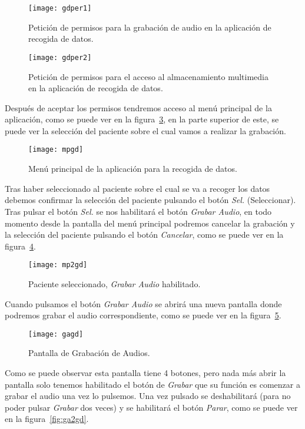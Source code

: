 \begin{figure}[htb]
	\centering
	\texttt{[image: gdper1]}
	\caption{Petición de permisos para la grabación de audio en la aplicación de recogida de datos.}
	\label{fig:gdper1}
\end{figure}

\begin{figure}[H]
	\centering
	\texttt{[image: gdper2]}
	\caption{Petición de permisos para el acceso al almacenamiento multimedia en la aplicación de recogida de datos.}
	\label{fig:gdper2}
\end{figure}

Después de aceptar los permisos tendremos acceso al menú principal de la aplicación, como se puede ver en la figura~\ref{fig:mpgd}, en la parte superior de este, se puede ver la selección del paciente sobre el cual vamos a realizar la grabación.

\begin{figure}[h]
	\centering
	\texttt{[image: mpgd]}
	\caption{Menú principal de la aplicación para la recogida de datos.}
	\label{fig:mpgd}
\end{figure}

Tras haber seleccionado al paciente sobre el cual se va a recoger los datos debemos confirmar la selección del paciente pulsando el botón \textit{Sel.} (Seleccionar). Tras pulsar el botón \textit{Sel.} se nos habilitará el botón \textit{Grabar Audio}, en todo momento desde la pantalla del menú principal podremos cancelar la grabación y la selección del paciente pulsando el botón \textit{Cancelar}, como se puede ver en la figura~\ref{fig:mp2gd}.

\begin{figure}[H]
	\centering
	\texttt{[image: mp2gd]}
	\caption{Paciente seleccionado, \textit{Grabar Audio} habilitado.}
	\label{fig:mp2gd}
\end{figure}

Cuando pulsamos el botón \textit{Grabar Audio} se abrirá una nueva pantalla donde podremos grabar el audio correspondiente, como se puede ver en la figura~\ref{fig:gagd}.

\begin{figure}[H]
	\centering
	\texttt{[image: gagd]}
	\caption{Pantalla de Grabación de Audios.}
	\label{fig:gagd}
\end{figure}

Como se puede observar esta pantalla tiene 4 botones, pero nada más abrir la pantalla solo tenemos habilitado el botón de \textit{Grabar} que su función es comenzar a grabar el audio una vez lo pulsemos. Una vez pulsado se deshabilitará (para no poder pulsar \textit{Grabar} dos veces) y se habilitará el botón \textit{Parar}, como se puede ver en la figura~\ref{fig:ga2gd}.


